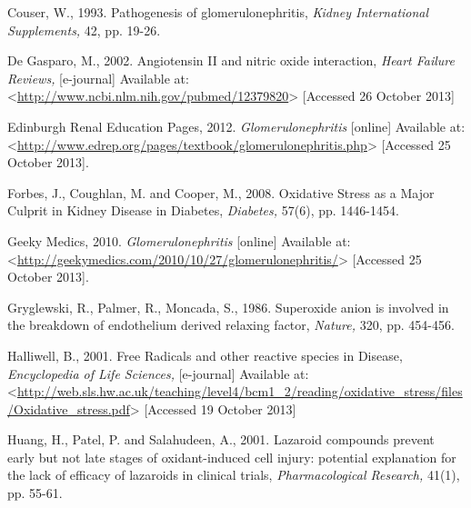\documentclass[12pt]{report}
\begin{document}
Couser, W., 1993. Pathogenesis of glomerulonephritis, \textit{Kidney International Supplements,} 42, pp. 19-26.
\newline
\newline

De Gasparo, M., 2002. Angiotensin II and nitric oxide interaction, \textit{Heart Failure Reviews,} [e-journal] Available at:<\url{http://www.ncbi.nlm.nih.gov/pubmed/12379820}> [Accessed 26 October 2013]
\newline
\newline

Edinburgh Renal Education Pages, 2012. \textit{Glomerulonephritis} [online] Available at: <\url{http://www.edrep.org/pages/textbook/glomerulonephritis.php}> [Accessed 25 October 2013].
\newline
\newline

Forbes, J., Coughlan, M. and Cooper, M., 2008. Oxidative Stress as a Major Culprit in Kidney Disease in Diabetes, \textit{Diabetes,} 57(6), pp. 1446-1454.
\newline
\newline

Geeky Medics, 2010. \textit{Glomerulonephritis} [online] Available at: <\url{http://geekymedics.com/2010/10/27/glomerulonephritis/}> [Accessed 25 October 2013].
\newline
\newline

Gryglewski, R., Palmer, R., Moncada, S., 1986. Superoxide anion is involved in the break­down of endothelium derived relaxing factor, \textit{Nature,} 320, pp. 454-456.
\newline
\newline

Halliwell, B., 2001. Free Radicals and other reactive species in Disease, \textit{Encyclopedia of Life Sciences,} [e-journal] Available at:<\url{http://web.sls.hw.ac.uk/teaching/level4/bcm1_2/reading/oxidative_stress/files/Oxidative_stress.pdf}> [Accessed 19 October 2013]
\newline
\newline

Huang, H., Patel, P. and Salahudeen, A., 2001. Lazaroid compounds prevent early but not late stages of oxidant-induced cell injury: potential explanation for the lack of efficacy of lazaroids in clinical trials, \textit{Pharmacological Research,} 41(1), pp. 55-61.
\newline
\newline
\end{document}
